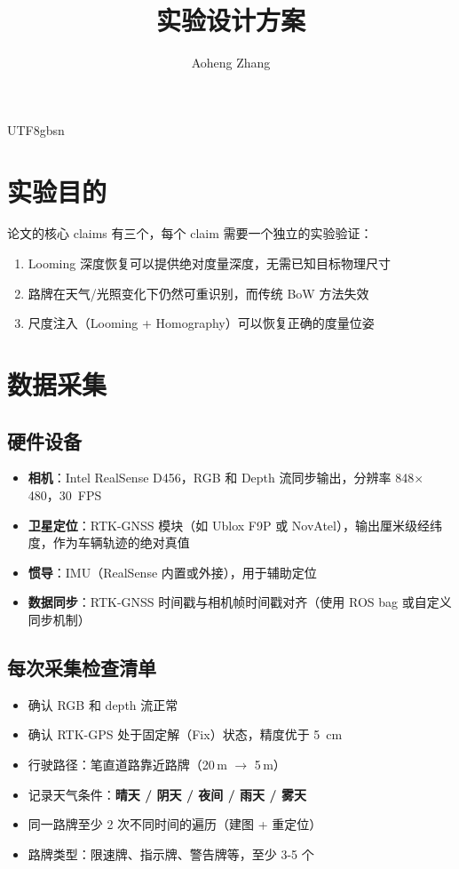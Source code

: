 \documentclass{article}
\title{实验设计方案}
\author{Aoheng Zhang}
\date{}
\begin{document}
\begin{CJK}{UTF8}{gbsn}
\maketitle

\section{实验目的}

论文的核心 claims 有三个，每个 claim 需要一个独立的实验验证：

\begin{enumerate}
    \item Looming 深度恢复可以提供绝对度量深度，无需已知目标物理尺寸
    \item 路牌在天气/光照变化下仍然可重识别，而传统 BoW 方法失效
    \item 尺度注入（Looming + Homography）可以恢复正确的度量位姿
\end{enumerate}

\section{数据采集}

\subsection{硬件设备}

\begin{itemize}
    \item \textbf{相机}：Intel RealSense D456，RGB 和 Depth 流同步输出，分辨率 848$\times$480，30~FPS
    \item \textbf{卫星定位}：RTK-GNSS 模块（如 Ublox F9P 或 NovAtel），输出厘米级经纬度，作为车辆轨迹的绝对真值
    \item \textbf{惯导}：IMU（RealSense 内置或外接），用于辅助定位
    \item \textbf{数据同步}：RTK-GNSS 时间戳与相机帧时间戳对齐（使用 ROS bag 或自定义同步机制）
\end{itemize}

\subsection{每次采集检查清单}

\begin{itemize}
    \item 确认 RGB 和 depth 流正常
    \item 确认 RTK-GPS 处于固定解（Fix）状态，精度优于 5~cm
    \item 行驶路径：笔直道路靠近路牌（20\,m $\rightarrow$ 5\,m）
    \item 记录天气条件：\textbf{晴天 / 阴天 / 夜间 / 雨天 / 雾天}
    \item 同一路牌至少 2 次不同时间的遍历（建图 + 重定位）
    \item 路牌类型：限速牌、指示牌、警告牌等，至少 3-5 个
\end{itemize}


\end{CJK}
\end{document}
